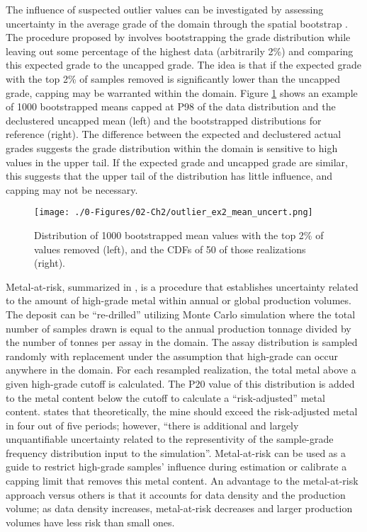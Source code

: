The influence of suspected outlier values can be investigated by assessing uncertainty in the average grade of the domain through the spatial bootstrap \citep{solow1985bootstrapping}. The procedure proposed by \cite{nowak2013suggestions} involves bootstrapping the grade distribution while leaving out some percentage of the highest data (arbitrarily 2\%) and comparing this expected grade to the uncapped grade. The idea is that if the expected grade with the top 2\% of samples removed is significantly lower than the uncapped grade, capping may be warranted within the domain. Figure \ref{fig:outlier_ex2_mean_uncert} shows an example of 1000 bootstrapped means capped at P98 of the data distribution and the declustered uncapped mean (left) and the bootstrapped distributions for reference (right). The difference between the expected and declustered actual grades suggests the grade distribution within the domain is sensitive to high values in the upper tail. If the expected grade and uncapped grade are similar, this suggests that the upper tail of the distribution has little influence, and capping may not be necessary.

\begin{figure}[htb!]
    \centering
    \texttt{[image: ./0-Figures/02-Ch2/outlier\_ex2\_mean\_uncert.png]}
    \caption{Distribution of 1000 bootstrapped mean values with the top 2\% of values removed (left), and the \glspl{CDF} of 50 of those realizations (right). }
    \label{fig:outlier_ex2_mean_uncert}
\end{figure}

Metal-at-risk, summarized in \cite{parker2006}, is a procedure that establishes uncertainty related to the amount of high-grade metal within annual or global production volumes. The deposit can be ``re-drilled'' utilizing Monte Carlo simulation where the total number of samples drawn is equal to the annual production tonnage divided by the number of tonnes per assay in the domain. The assay distribution is sampled randomly with replacement under the assumption that high-grade can occur anywhere in the domain. For each resampled realization, the total metal above a given high-grade cutoff is calculated. The P20 value of this distribution is added to the metal content below the cutoff to calculate a ``risk-adjusted'' metal content. \cite{parker2006} states that theoretically, the mine should exceed the risk-adjusted metal in four out of five periods; however, ``there is additional and largely unquantifiable uncertainty related to the representivity of the sample-grade frequency distribution input to the simulation''. Metal-at-risk can be used as a guide to restrict high-grade samples' influence during estimation or calibrate a capping limit that removes this metal content. An advantage to the metal-at-risk approach versus others is that it accounts for data density and the production volume; as data density increases, metal-at-risk decreases and larger production volumes have less risk than small ones.

